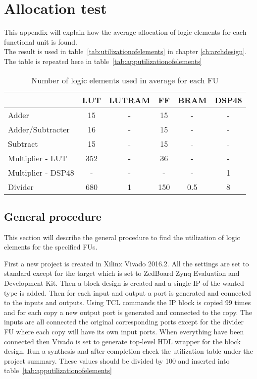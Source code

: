\chapter{Allocation test}\label{app:alloctest}
This appendix will explain how the average allocation of logic elements for each functional unit is found.\\
The result is used in table~\vref{tab:utilizationofelements} in chapter \ref{ch:archdesign}. The table is repeated here in table~\vref{tab:apputilizationofelements}

\begin{table}[ht!]
\centering
\begin{tabular}{l | c c c c c }
  \toprule
   &  LUT & LUTRAM & FF & BRAM & DSP48 \\
  \midrule
  Adder & 15 & - & 15 & - & - \\
  Adder/Subtracter  & 16 & - & 15 & - & - \\
  Subtract  & 15 & - & 15 & - & - \\
  Multiplier - LUT  & 352 & - & 36 & - & - \\
  Multiplier - DSP48 & - & - & - & - & 1 \\
  Divider & 680 & 1 & 150 & 0.5 & 8 \\
  \bottomrule
\end{tabular}
\caption{Number of logic elements used in average for each FU}
\label{tab:apputilizationofelements}
\end{table}

\section{General procedure}
This section will describe the general procedure to find the utilization of logic elements for the specified FUs. 

First a new project is created in Xilinx Vivado 2016.2. All the settings are set to standard except for the target which is set to ZedBoard Zynq Evaluation and Development Kit. Then a block design is created and a single IP of the wanted type is added. Then for each input and output a port is generated and connected to the inputs and outputs. Using TCL commands the IP block is copied 99 times and for each copy a new output port is generated and connected to the copy. The inputs are all connected the original corresponding ports except for the divider FU where each copy will have its own input ports. When everything have been connected then Vivado is set to generate top-level HDL wrapper for the block design. Run a synthesis and after completion check the utilization table under the project summary. These values should be divided by 100 and inserted into table~\vref{tab:apputilizationofelements}

